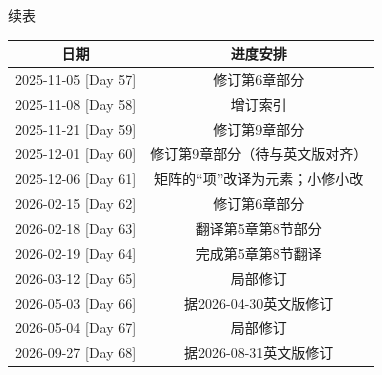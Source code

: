 \documentclass{ctexart}
\begin{document}
\pagebreak
续表

\begin{table}[h]
    \centering
    \begin{tabular}{|c|c|}
    \hline
    \textbf{日期} & \textbf{进度安排}  \\ \hline
    2025-11-05 [Day 57] & 修订第6章部分\\ \hline
    2025-11-08 [Day 58] & 增订索引\\ \hline
    2025-11-21 [Day 59] & 修订第9章部分\\ \hline
    2025-12-01 [Day 60] & 修订第9章部分（待与英文版对齐）\\ \hline
    2025-12-06 [Day 61] & 矩阵的“项”改译为元素；小修小改\\ \hline
    2026-02-15 [Day 62] & 修订第6章部分\\ \hline
    2026-02-18 [Day 63] & 翻译第5章第8节部分\\ \hline
    2026-02-19 [Day 64] & 完成第5章第8节翻译\\ \hline
    2026-03-12 [Day 65] & 局部修订\\ \hline
    2026-05-03 [Day 66] & 据2026-04-30英文版修订\\ \hline
    2026-05-04 [Day 67] & 局部修订\\ \hline
    2026-09-27 [Day 68] & 据2026-08-31英文版修订\\ \hline
    \end{tabular}
\end{table}
\end{document}
